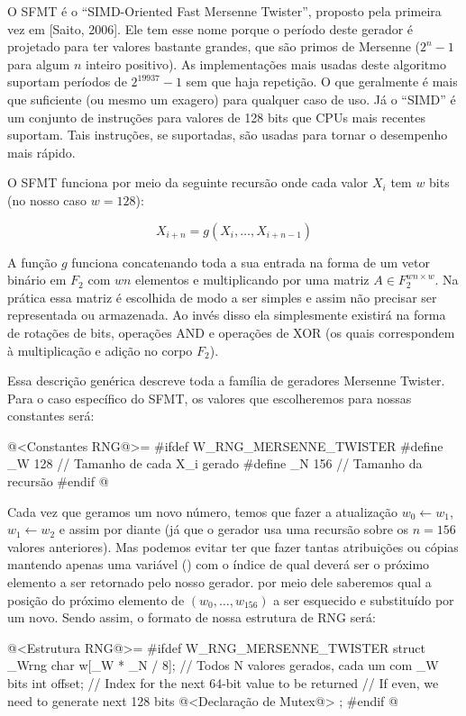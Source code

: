 
O SFMT é o ``SIMD-Oriented Fast Mersenne Twister'', proposto pela
primeira vez em [Saito, 2006]. Ele tem esse nome porque o período
deste gerador é projetado para ter valores bastante grandes, que são
primos de Mersenne ($2^n-1$ para algum $n$ inteiro positivo). As
implementações mais usadas deste algoritmo suportam períodos de
$2^{19937}-1$ sem que haja repetição. O que geralmente é mais que
suficiente (ou mesmo um exagero) para qualquer caso de uso. Já o
``SIMD'' é um conjunto de instruções para valores de 128 bits que CPUs
mais recentes suportam. Tais instruções, se suportadas, são usadas
para tornar o desempenho mais rápido.

O SFMT funciona por meio da seguinte recursão onde cada valor $X_i$
tem $w$ bits (no nosso caso $w=128$):

$$
X_{i+n}=g(X_i, \ldots, X_{i+n-1})
$$

A função $g$ funciona concatenando toda a sua entrada na forma de um
vetor binário em $F_2$ com $wn$ elementos e multiplicando por
uma matriz $A\in F_2^{wn\times w}$. Na prática essa matriz é
escolhida de modo a ser simples e assim não precisar ser representada
ou armazenada. Ao invés disso ela simplesmente existirá na forma de
rotações de bits, operações AND e operações de XOR (os quais
correspondem à multiplicação e adição no corpo $F_2$).

Essa descrição genérica descreve toda a família de geradores Mersenne
Twister. Para o caso específico do SFMT, os valores que escolheremos
para nossas constantes será:

\iniciocodigo
@<Constantes RNG@>=
#ifdef W_RNG_MERSENNE_TWISTER
#define _W 128 // Tamanho de cada X_i gerado
#define _N 156 // Tamanho da recursão
#endif
@
\fimcodigo

Cada vez que geramos um novo número, temos que fazer a atualização
$w_0 \leftarrow w_1$, $w_1 \leftarrow w_2$ e assim por diante (já que
o gerador usa uma recursão sobre os $n=156$ valores anteriores). Mas
podemos evitar ter que fazer tantas atribuições ou cópias mantendo
apenas uma variável () com o índice de qual deverá ser
o próximo elemento a ser retornado pelo nosso gerador. por meio dele
saberemos qual a posição do próximo elemento de $(w_0, \ldots,
w_{156})$ a ser esquecido e substituído por um novo. Sendo assim, o
formato de nossa estrutura de RNG será:

\iniciocodigo
@<Estrutura RNG@>=
#ifdef W_RNG_MERSENNE_TWISTER
struct _Wrng{
  char w[_W * _N / 8]; // Todos N valores gerados, cada um com _W bits
  int offset;          // Index for the next 64-bit value to be returned
                       // If even, we need to generate next 128 bits
  @<Declaração de Mutex@>
};
#endif
@
\fimcodigo

